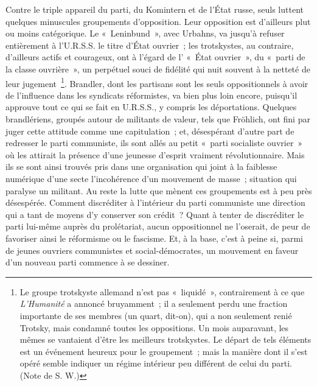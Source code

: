 \documentclass[french,twoside]{book} %
\begin{document}
Contre le triple appareil du parti, du Komintern et de l'État russe, seuls luttent quelques minuscules groupements d'opposition. Leur opposition est d'ailleurs plut ou moins catégorique. Le « Leninbund », avec Urbahns, va jusqu'à refuser entièrement à l'U.R.S.S. le titre d'État ouvrier ; les trotskystes, au contraire, d'ailleurs actifs et courageux, ont à l'égard de l' « État ouvrier », du « parti de la classe ouvrière », un perpétuel souci de fidélité qui nuit souvent à la netteté de leur jugement \footnote{ Le groupe trotskyste allemand n'est pas « liquidé », contrairement à ce que {\itshape L'Humanité} a annoncé bruyamment ; il a seulement perdu une fraction importante de ses membres (un quart, dit-on), qui a non seulement renié Trotsky, mais condamné toutes les oppositions. Un mois auparavant, les mêmes se vantaient d'être les meilleurs trotskystes. Le départ de tels éléments est un événement heureux pour le groupement ; mais la manière dont il s'est opéré semble indiquer un régime intérieur peu différent de celui du parti. (Note de S. W.)}. Brandler, dont les partisans sont les seuls oppositionnels à avoir de l'influence dans les syndicats réformistes, va bien plus loin encore, puisqu'il approuve tout ce qui se fait en U.R.S.S., y compris les déportations. Quelques brandlériens, groupés autour de militants de valeur, tels que Fröhlich, ont fini par juger cette attitude comme une capitulation ; et, désespérant d'autre part de redresser le parti communiste, ils sont allés au petit « parti socialiste ouvrier » où les attirait la présence d'une jeunesse d'esprit vraiment révolutionnaire. Mais ils se sont ainsi trouvés pris dans une organisation qui joint à la faiblesse numérique d'une secte l'incohé­rence d'un mouvement de masse ; situation qui paralyse un militant. Au reste la lutte que mènent ces groupements est à peu près désespérée. Comment discréditer à l'intérieur du parti communiste une direction qui a tant de moyens d'y conserver son crédit ? Quant à tenter de discréditer le parti lui-mê­me auprès du prolétariat, aucun oppositionnel ne l'oserait, de peur de favoriser ainsi le réformisme ou le fascisme. Et, à la base, c'est à peine si, parmi de jeunes ouvriers communistes et social-démocrates, un mouvement en faveur d'un nouveau parti commence à se dessiner.\par
\par
\end{document}
